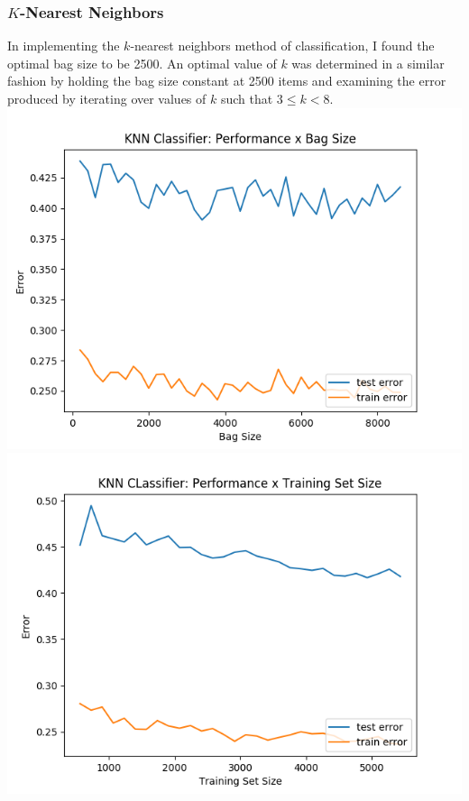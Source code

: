 \documentclass[11pt, a4paper]{article} %
\begin{document}
\subsubsection{$K$-Nearest Neighbors}
In implementing the $k$-nearest neighbors method of classification, I found the optimal bag size to be 2500. An optimal value of $k$ was determined in a similar fashion by holding the bag size constant at 2500 items and examining the error produced by iterating over values of $k$ such that $3\leq k< 8$.
\includegraphics[scale=0.525]{kNN_BS.png}
\includegraphics[scale=0.525]{kNN_TSS4.png}
\end{document}
